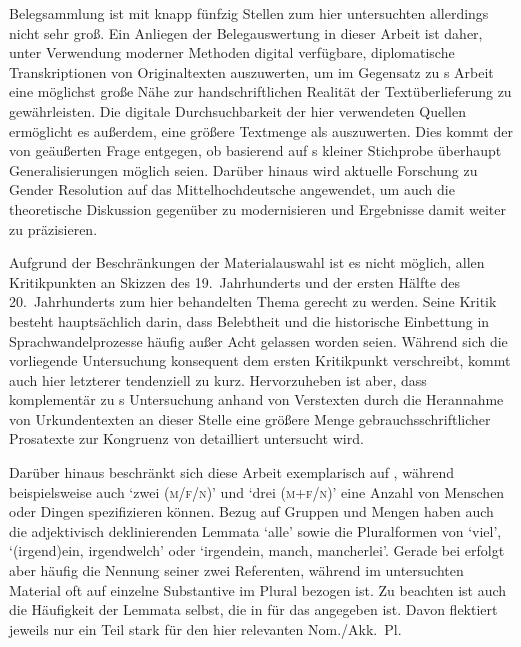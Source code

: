  Belegsammlung ist mit knapp fünfzig Stellen zum hier
untersuchten  allerdings nicht sehr groß. Ein Anliegen der
Belegauswertung in dieser Arbeit ist daher, unter Verwendung moderner Methoden
digital verfügbare, diplomatische Transkriptionen von Originaltexten
auszuwerten, um im Gegensatz zu \citeauthor{askedal1973}s Arbeit eine möglichst
große Nähe zur handschriftlichen Realität der Textüberlieferung zu
gewährleisten. Die digitale Durchsuchbarkeit der hier verwendeten Quellen
ermöglicht es außerdem, eine größere Textmenge als \citeauthor{askedal1973}
auszuwerten. Dies kommt der von \citet[118]{fleischerschallert2011} geäußerten
Frage entgegen, ob basierend auf \citeauthor{askedal1973}s kleiner Stichprobe
überhaupt Generalisierungen möglich seien. Darüber hinaus wird aktu\-elle
Forschung zu Gender Resolution auf das Mittelhochdeutsche
angewendet, um auch die theoretische Diskussion gegenüber \citet{askedal1973}
zu modernisieren und Ergebnisse damit weiter zu präzisieren.

Aufgrund der Beschränkungen der Materialauswahl ist es nicht möglich, allen
Kritikpunkten  an Skizzen des 19.\ Jahrhunderts und der
ersten Hälfte des 20.\ Jahrhunderts zum hier behandelten Thema gerecht zu
werden. Seine Kritik besteht hauptsächlich darin, dass Belebtheit und die
historische Einbettung in Sprachwandelprozesse häufig außer Acht gelassen
worden seien. Während sich die vorliegende Untersuchung konsequent dem ersten
Kritikpunkt verschreibt, kommt auch hier letzterer tendenziell zu kurz.
Hervorzuheben ist aber, dass komplementär zu \citeauthor{askedal1973}s
Unter\-suchung anhand von Vers\-texten durch die Herannahme von Urkundentexten
an dieser Stelle eine größere Menge gebrauchsschriftlicher Prosatexte zur
Kongruenz von  detailliert untersucht wird.

Darüber hinaus beschränkt sich diese Arbeit exemplarisch auf ,
während beispielsweise auch  `zwei (\textsc{m/f/n})' und
 `drei (\textsc{m+f/n})' eine Anzahl von Menschen oder Dingen
spezifizieren können. Bezug auf Gruppen und Mengen haben auch die adjektivisch
deklinierenden Lemmata  `alle' sowie die Pluralformen von
 `viel',  `(irgend)ein, irgendwelch' oder
 `irgendein, manch, mancherlei'. Gerade bei 
erfolgt aber häufig die Nennung seiner zwei Referenten, während im untersuchten
Material  oft auf einzelne Substantive im Plural bezogen ist. Zu
beachten ist auch die Häufigkeit der Lemmata selbst, die in
 für das \CAO{} angegeben ist. Davon flektiert
jeweils nur ein Teil stark für den hier relevanten Nom./Akk.~Pl.

